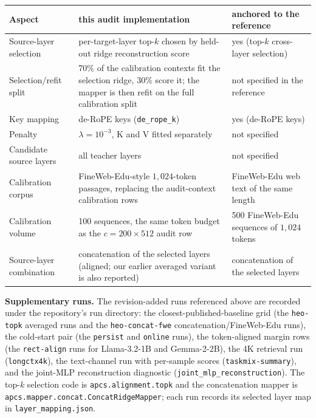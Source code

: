 \documentclass[10pt]{article}
\begin{document}
\begin{center}\footnotesize
\begin{tabular}{p{3.0cm}p{5.5cm}p{3.6cm}}
\toprule
Aspect & this audit implementation & anchored to the reference \\
\midrule
Source-layer selection & per-target-layer top-$k$ chosen by held-out ridge reconstruction score
 & yes (top-$k$ cross-layer selection) \\
Selection/refit split & 70\% of the calibration contexts fit the selection ridge, 30\% score it; the mapper is
then refit on the full calibration split & not specified in the reference \\
Key mapping & de-RoPE keys (\texttt{de\_rope\_k}) & yes (de-RoPE keys) \\
Penalty & $\lambda=10^{-3}$, K and V fitted separately & not specified \\
Candidate source layers & all teacher layers & not specified \\
Calibration corpus & FineWeb-Edu-style $1{,}024$-token passages, replacing the
audit-context calibration rows & FineWeb-Edu web text of the same length \\
Calibration volume & 100 sequences, the same token budget as the $c{=}200\times512$ audit row & 500 FineWeb-Edu sequences of $1{,}024$ tokens \\
Source-layer combination & concatenation of the selected layers (aligned; our
earlier averaged variant is also reported) & concatenation of the selected layers \\
\bottomrule
\end{tabular}\end{center}

\textbf{Supplementary runs.} The revision-added runs referenced above are
recorded under the repository's run directory: the closest-published-baseline
grid (the \texttt{heo-topk} averaged runs and the \texttt{heo-concat-fwe}
concatenation/FineWeb-Edu runs), the cold-start pair (the \texttt{persist} and
\texttt{online} runs), the token-aligned margin rows (the \texttt{rect-align}
runs for Llama-3.2-1B and Gemma-2-2B), the 4K retrieval run
(\texttt{longctx4k}), the text-channel run with per-sample scores
(\texttt{taskmix-summary}), and the joint-MLP reconstruction diagnostic
(\texttt{joint\_mlp\_reconstruction}). The top-$k$ selection code is
\texttt{apcs.alignment.topk} and the concatenation mapper is
\texttt{apcs.mapper.concat.ConcatRidgeMapper}; each run records its selected
layer map in \texttt{layer\_mapping.json}.
\end{document}
